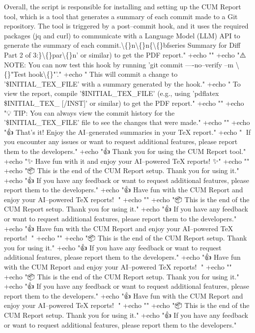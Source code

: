 \documentclass{article}
\begin{document}
{Overall, the script is responsible for installing and setting up the CUM Report tool, which is a tool that generates a summary of each commit made to a Git repository. The tool is triggered by a post--commit hook, and it uses the required packages (jq and curl) to communicate with a Language Model (LLM) API to generate the summary of each commit.\textbackslash\{\}n\textbackslash\{\}n\{\textbackslash\{\}bfseries Summary for Diff Part 2 of 3:\}\textbackslash\{\}par\textbackslash\{\}n' or similar) to get the PDF report."
+echo ""
+echo "⚠️ NOTE: You can now test this hook by running 'git commit ----no--verify --m \textbackslash\{\}"Test hook\textbackslash\{\}"'."
+echo "    This will commit a change to '\$INITIAL\_TEX\_FILE' with a summary generated by the hook."
+echo "    To view the report, compile '\$INITIAL\_TEX\_FILE' (e.g., using 'pdflatex \$INITIAL\_TEX\_ [/INST]' or similar) to get the PDF report."
+echo ""
+echo "💡 TIP: You can always view the commit history for the '\$INITIAL\_TEX\_FILE' file to see the changes that were made."
+echo ""
+echo "👍 That's it! Enjoy the AI--generated summaries in your TeX report."
+echo "🤖  If you encounter any issues or want to request additional features, please report them to the developers."
+echo "👍 Thank you for using the CUM Report tool."
+echo "✨ Have fun with it and enjoy your AI--powered TeX reports! ✨"
+echo ""
+echo "📦 This is the end of the CUM Report setup. Thank you for using it."
+echo "👍 If you have any feedback or want to request additional features, please report them to the developers."
+echo "👍 Have fun with the CUM Report and enjoy your AI--powered TeX reports! 🤖"
+echo ""
+echo "📦 This is the end of the CUM Report setup. Thank you for using it."
+echo "👍 If you have any feedback or want to request additional features, please report them to the developers."
+echo "👍 Have fun with the CUM Report and enjoy your AI--powered TeX reports! 🤖"
+echo ""
+echo "📦 This is the end of the CUM Report setup. Thank you for using it."
+echo "👍 If you have any feedback or want to request additional features, please report them to the developers."
+echo "👍 Have fun with the CUM Report and enjoy your AI--powered TeX reports! 🤖"
+echo ""
+echo "📦 This is the end of the CUM Report setup. Thank you for using it."
+echo "👍 If you have any feedback or want to request additional features, please report them to the developers."
+echo "👍 Have fun with the CUM Report and enjoy your AI--powered TeX reports! 🤖"
+echo ""
+echo "📦 This is the end of the CUM Report setup. Thank you for using it."
+echo "👍 If you have any feedback or want to request additional features, please report them to the developers."
}
\end{document}

